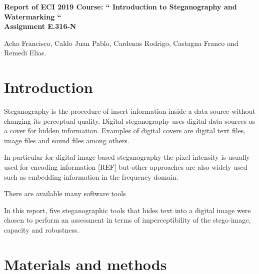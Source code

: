 \documentclass[11pt]{article}
\begin{document}
\pagestyle{empty}

\begin{center}

{\Large {\bf Report of ECI 2019 Course: `` Introduction to Steganography and Watermarking ``}} \\

\bigskip
{\large \bf Assignment E.316-N}
\end{center}

\begin{center}
Acha Francisco, Caldo Juan Pablo, Cardenas Rodrigo, Castagna Franco and Remedi Elias.
\end{center}


\section{Introduction}

Steganography is the procedure of insert information inside a data source without changing its perceptual quality.
Digital steganography uses digital data sources as a cover for hidden information. Examples of digital covers
are digital text files, image files and sound files among others.  

In particular for digital image based steganography the pixel intensity is usually used for encoding information [REF]
but other approaches are also widely used such as embedding information in the frequency domain.

There are available many software tools 

In this report, five steganographic tools that hides text into a digital image were chosen to perform an assessment 
in terms of imperceptibility of the stego-image, capacity and robustness.

\section{Materials and methods}
\end{document}
